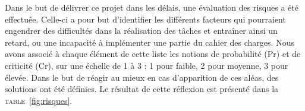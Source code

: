 

    Dans le but de délivrer ce projet dans les délais, une évaluation des risques a été effectuée. Celle-ci a pour but d'identifier les différents facteurs qui pourraient engendrer des difficultés dans la réalisation des tâches et entraîner ainsi un retard, ou une incapacité à implémenter une partie du cahier des charges. Nous avons associé à chaque élément de cette liste les notions de probabilité (Pr) et de criticité (Cr), sur une échelle de 1 à 3 : 1 pour faible, 2 pour moyenne, 3 pour élevée. Dans le but de réagir au mieux en cas d’apparition de ces aléas, des solutions ont été définies. Le résultat de cette réflexion est présenté dans la \textsc{table}~\ref{fig:risques}. 


